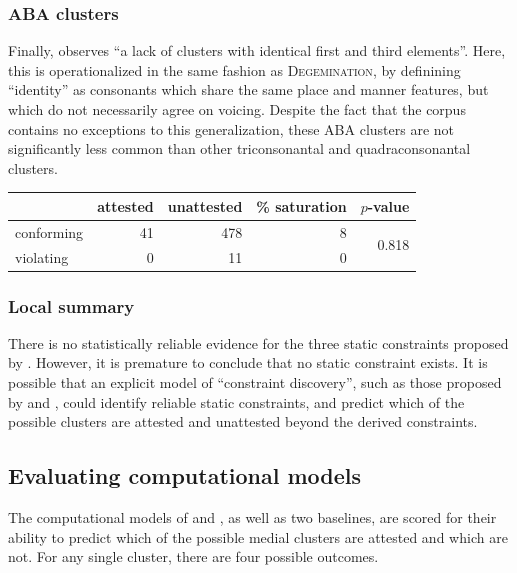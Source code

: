 \subsubsection{ABA clusters}

Finally, \citet[][176]{Pierrehumbert1994} observes ``a lack of clusters with identical first and third elements''. Here, this is operationalized in the same fashion as \textsc{Degemination}, by definining ``identity'' as consonants which share the same place and manner features, but which do not necessarily agree on voicing. Despite the fact that the corpus contains no exceptions to this generalization, these \textsc{ABA} clusters are not significantly less common than other triconsonantal and quadraconsonantal clusters.

\begin{example}
\begin{tabular}{l r r r r}
\toprule
           & attested & unattested & \% saturation & $p$-value \\
\midrule
conforming & 41       & 478        & 8             & \multirow{2}{*}{0.818} \\
violating  &  0       &  11        & 0             \\
\bottomrule
\end{tabular}
\end{example}

\subsubsection{Local summary}

There is no statistically reliable evidence for the three static constraints proposed by \citeauthor{Pierrehumbert1994}. However, it is premature to conclude that no static constraint exists. It is possible that an explicit model of ``constraint discovery'', such as those proposed by \citet{Pierrehumbert1994} and \citet{Hayes2008a}, could identify reliable static constraints, and predict which of the possible clusters are attested and unattested beyond the derived constraints. 

\subsection{Evaluating computational models}

The computational models of \citeauthor{Pierrehumbert1994} and \citeauthor{Hayes2008a}, as well as two baselines, are scored for their ability to predict which of the possible medial clusters are attested and which are not. For any single cluster, there are four possible outcomes.

